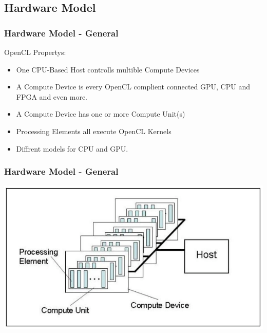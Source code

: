 \documentclass{beamer}
\begin{document}
\subsection{Hardware Model}
\begin{frame}
    \frametitle{Hardware Model - General}
    OpenCL Propertys:
    \begin{itemize}
     	\item One CPU-Based Host controlls multible Compute Devices
     	\item A Compute Device is every OpenCL complient connected GPU, CPU and FPGA and even more.
     	\item A Compute Device has one or more Compute Unit(s)
     	\item Processing Elements all execute OpenCL Kernels
	\item Diffrent models for CPU and GPU.
    \end{itemize}
\end{frame}
\begin{frame}
    \frametitle{Hardware Model - General}
    \includegraphics[width=\textwidth]{res/KhronosPlatformModel.png}
\end{frame}
\end{document}
